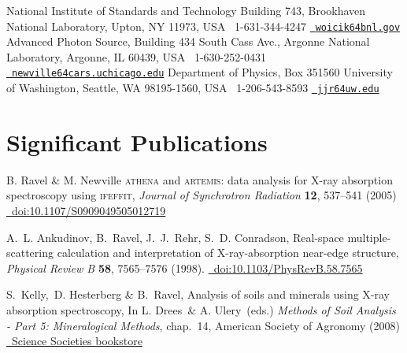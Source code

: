 \documentclass[11pt]{moderncv}
\begin{document}
%
{National Institute of Standards and Technology\newline
  Building 743, Brookhaven National Laboratory, Upton, NY 11973, USA\newline
  \phonesymbol\ 1-631-344-4247\quad
  \href{mailto:woicik@bnl.gov}{\emailsymbol\ \footnotesize\texttt{woicik\char64bnl.gov}}}
%
{Advanced Photon Source, Building 434 South Cass Ave., Argonne National Laboratory, Argonne, IL 60439, USA\newline
  \phonesymbol\ 1-630-252-0431\quad
  \href{mailto:newville@cars.uchicago.edu}
  {\emailsymbol\ \footnotesize\texttt{newville\char64cars.uchicago.edu}}}
%
{Department of Physics, Box 351560\newline
  University of Washington, Seattle, WA 98195-1560, USA\newline
  \phonesymbol\ 1-206-543-8593\quad
  \href{mailto:jjr@uw.edu}{\emailsymbol\ \footnotesize\texttt{jjr\char64uw.edu}}}

\section{Significant Publications}
\label{sec:highlights}

%
{\small B. Ravel \& M. Newville \textsc{athena} and
  \textsc{artemis}: data analysis for X-ray absorption spectroscopy
  using \textsc{ifeffit}, \emph{Journal of Synchrotron Radiation}
  \textbf{12}, 537--541 (2005)
  \href{https://doi.org/10.1107/S0909049505012719}
  {\color{color2}\homepagesymbol~doi:10.1107/S0909049505012719}}

%
{\small A.~L. Ankudinov,  B.~Ravel,  J.~J.~Rehr,  S.~D. Conradson,
  Real-space multiple-scattering calculation and interpretation of
  X-ray-absorption near-edge structure, \emph{Physical Review B}
  \textbf{58}, 7565--7576 (1998).
  \href{https://doi.org/10.1103/PhysRevB.58.7565}
  {\color{color2}\homepagesymbol~doi:10.1103/PhysRevB.58.7565}}

%
{\small S.\ Kelly,\ D. Hesterberg \& B.\ Ravel, Analysis of soils and
  minerals using X-ray absorption spectroscopy, In L. Drees\ \&
  A. Ulery\ (eds.)  \emph{Methods of Soil Analysis - Part 5:
    Mineralogical Methods}, chap.~14, American Society of Agronomy
  (2008)
  \href{https://portal.sciencesocieties.org/Purchase/ProductDetail.aspx?Product_code=802f0511-76f0-dc11-b6b8-0013210e308c}
  {\color{color2}\homepagesymbol~Science Societies bookstore}}
\end{document}
